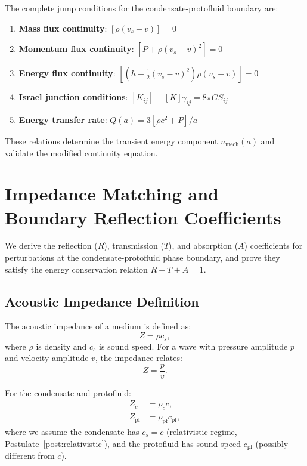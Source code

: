 \documentclass[11pt,a4paper]{article}
\newcommand{\umech}{\ensuremath{u_{\mathrm{mech}}}}
\theoremstyle{definition}
\theoremstyle{remark}
\begin{document}
The complete jump conditions for the condensate-protofluid boundary are:

\begin{enumerate}[leftmargin=*, itemsep=0.2em]
\item \textbf{Mass flux continuity}: $[\rho(v_s - v)] = 0$
\item \textbf{Momentum flux continuity}: $[P + \rho(v_s - v)^2] = 0$
\item \textbf{Energy flux continuity}: $[(h + \frac{1}{2}(v_s - v)^2)\rho(v_s - v)] = 0$
\item \textbf{Israel junction conditions}: $[K_{ij}] - [K]\gamma_{ij} = 8\pi G S_{ij}$
\item \textbf{Energy transfer rate}: $Q(a) = 3[\rho c^2 + P]/a$
\end{enumerate}

These relations determine the transient energy component $\umech(a)$ and validate the modified continuity equation.

\section{Impedance Matching and Boundary Reflection Coefficients}
\label{app:impedance}

We derive the reflection ($R$), transmission ($T$), and absorption ($A$) coefficients for perturbations at the condensate-protofluid phase boundary, and prove they satisfy the energy conservation relation $R + T + A = 1$.

\subsection{Acoustic Impedance Definition}
\label{sec:impedance_def}

The acoustic impedance of a medium is defined as:
\begin{equation}
\label{eq:impedance}
Z = \rho c_s,
\end{equation}
where $\rho$ is density and $c_s$ is sound speed. For a wave with pressure amplitude $p$ and velocity amplitude $v$, the impedance relates:
\begin{equation}
Z = \frac{p}{v}.
\end{equation}

For the condensate and protofluid:
\begin{align}
Z_c &= \rho_c c, \\
Z_{\mathrm{pf}} &= \rho_{\mathrm{pf}} c_{\mathrm{pf}},
\end{align}
where we assume the condensate has $c_s = c$ (relativistic regime, Postulate~\ref{post:relativistic}), and the protofluid has sound speed $c_{\mathrm{pf}}$ (possibly different from $c$).
\end{document}
